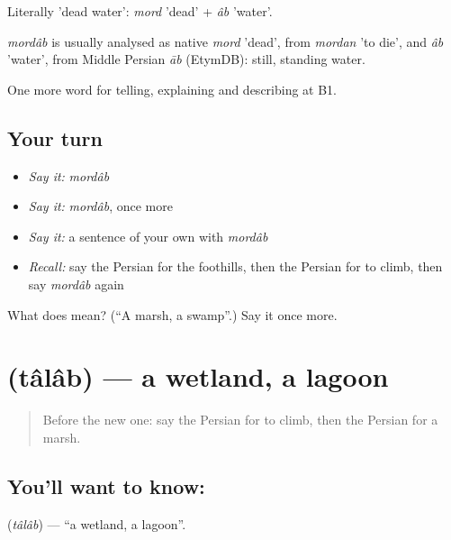 Literally 'dead water': \emph{mord} 'dead' + \emph{âb} 'water'.

\begin{cousinweb}
\emph{mordâb} is usually analysed as native \emph{mord} 'dead', from \emph{mordan} 'to die', and \emph{âb} 'water', from Middle Persian \emph{āb} (EtymDB): still, standing water.
\end{cousinweb}

\begin{grammarlens}[title={What you've built}]
One more word for telling, explaining and describing at B1.
\end{grammarlens}

\subsection*{Your turn}
\begin{itemize}
\raggedright
  \item \emph{Say it:} \emph{mordâb}
  \item \emph{Say it:} \emph{mordâb}, once more
  \item \emph{Say it:} a sentence of your own with \emph{mordâb}
  \item \emph{Recall:} say the Persian for the foothills, then the Persian for to climb, then say \emph{mordâb} again
\end{itemize}

\begin{tcolorbox}[breakable,colback=teal!4,colframe=teal!35!black,title={Before you move on}]
What does  mean? (\textquotedblleft{}A marsh, a swamp\textquotedblright{}.) Say it once more.
\end{tcolorbox}
\section[\texorpdfstring{\fa{تالاب} (tâlâb)}{تالاب (tâlâb)}]{ (tâlâb) — a wetland, a lagoon}

\label{lesson:FA-C469-talab}



\begin{quote}
Before the new one: say the Persian for to climb, then the Persian for a marsh.
\end{quote}

\subsection*{You'll want to know: }
\textbf{} (\emph{tâlâb}) — \textquotedblleft{}a wetland, a lagoon\textquotedblright{}.

